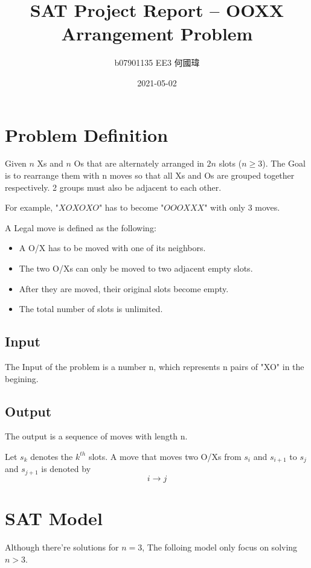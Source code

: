\documentclass{article}
\title{SAT Project Report -- OOXX Arrangement Problem}
\author{b07901135 EE3 何國瑋}
\date{2021-05-02}
\begin{document}
    \maketitle

    \section{Problem Definition}


    Given $n$ Xs and $n$ Os that are alternately arranged in $2n$ slots ($n\geq 3$).
    The Goal is to rearrange them with n moves 
    so that all Xs and Os are grouped together respectively.
    2 groups must also be adjacent to each other.

    For example, "$XOXOXO$" has to become "$OOOXXX$" with only 3 moves.

    A Legal move is defined as the following:
    \begin{itemize}
        \item A O/X has to be moved with one of its neighbors.
        \item The two O/Xs can only be moved to two adjacent empty slots.
        \item After they are moved, their original slots become empty.
        \item The total number of slots is unlimited.
    \end{itemize}

    \subsection{Input}
    The Input of the problem is a number n, which represents
    n pairs of "XO" in the begining.

    \subsection{Output}
    The output is a sequence of moves with length n.

    Let $s_k$ denotes the $k^{th}$ slots.
    A move that moves two O/Xs from $s_i$ and $s_{i+1}$ to 
    $s_j$ and $s_{j+1}$ is denoted by
    $$i \rightarrow j$$
        

    \section{SAT Model}

    Although there're solutions for $n=3$, The folloing model only
    focus on solving $n>3$.
\end{document}
